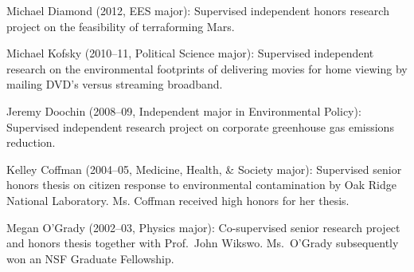 \item Michael Diamond (2012, EES major): Supervised independent honors research project on the feasibility of terraforming Mars.
\item Michael Kofsky (2010--11, Political Science major): Supervised independent research on the environmental footprints of delivering movies for home viewing by mailing DVD's versus streaming broadband.
\item Jeremy Doochin (2008--09, Independent major in Environmental Policy): Supervised independent research project on corporate greenhouse gas emissions reduction.
\item Kelley Coffman (2004--05, Medicine, Health, \& Society major): Supervised senior honors thesis on citizen response to environmental contamination by Oak Ridge National Laboratory. Ms. Coffman received high honors for her thesis.
\item Megan O'Grady (2002--03, Physics major): Co-supervised senior research project and honors thesis together with Prof.~John Wikswo. Ms.~O'Grady subsequently won an NSF Graduate Fellowship.
